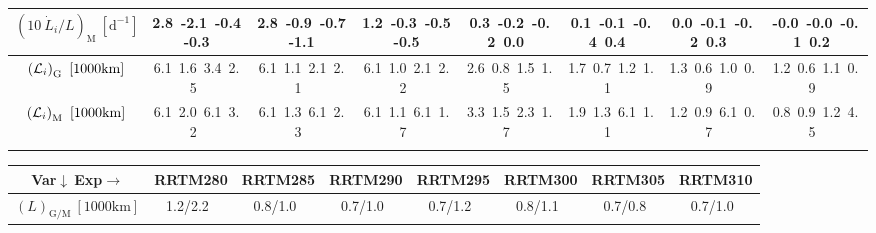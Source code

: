 \begin{table}[H]
{\begin{centering}
\begin{tabular}{|c|c|c|c|c|c|c|c|}
\hline
$\left(10\ \dot{L}_{i}/L\right)_{\mathrm{M}}\ \left[\mathrm{d^{-1}}\right]$ & \textcolor{C1}{2.8}\ \textcolor{C2}{-2.1}\ \textcolor{C3}{-0.4}\ \textcolor{C4}{-0.3}\  & \textcolor{C1}{2.8}\ \textcolor{C2}{-0.9}\ \textcolor{C3}{-0.7}\ \textcolor{C4}{-1.1}\  & \textcolor{C1}{1.2}\ \textcolor{C2}{-0.3}\ \textcolor{C3}{-0.5}\ \textcolor{C4}{-0.5}\  & \textcolor{C1}{0.3}\ \textcolor{C2}{-0.2}\ \textcolor{C3}{-0.2}\ \textcolor{C4}{0.0}\  & \textcolor{C1}{0.1}\ \textcolor{C2}{-0.1}\ \textcolor{C3}{-0.4}\ \textcolor{C4}{0.4}\  & \textcolor{C1}{0.0}\ \textcolor{C2}{-0.1}\ \textcolor{C3}{-0.2}\ \textcolor{C4}{0.3}\  & \textcolor{C1}{-0.0}\ \textcolor{C2}{-0.0}\ \textcolor{C3}{-0.1}\ \textcolor{C4}{0.2}\  \tabularnewline
\hline
$\left({\cal L}_{i}\right)_{\mathrm{G}}\ \left[1000\mathrm{km}\right]$ & \textcolor{C1}{6.1}\ \textcolor{C2}{1.6}\ \textcolor{C3}{3.4}\ \textcolor{C4}{2.5}\  & \textcolor{C1}{6.1}\ \textcolor{C2}{1.1}\ \textcolor{C3}{2.1}\ \textcolor{C4}{2.1}\  & \textcolor{C1}{6.1}\ \textcolor{C2}{1.0}\ \textcolor{C3}{2.1}\ \textcolor{C4}{2.2}\  & \textcolor{C1}{2.6}\ \textcolor{C2}{0.8}\ \textcolor{C3}{1.5}\ \textcolor{C4}{1.5}\  & \textcolor{C1}{1.7}\ \textcolor{C2}{0.7}\ \textcolor{C3}{1.2}\ \textcolor{C4}{1.1}\  & \textcolor{C1}{1.3}\ \textcolor{C2}{0.6}\ \textcolor{C3}{1.0}\ \textcolor{C4}{0.9}\  & \textcolor{C1}{1.2}\ \textcolor{C2}{0.6}\ \textcolor{C3}{1.1}\ \textcolor{C4}{0.9}\  \tabularnewline
\hline
$\left({\cal L}_{i}\right)_{\mathrm{M}}\ \left[1000\mathrm{km}\right]$ & \textcolor{C1}{6.1}\ \textcolor{C2}{2.0}\ \textcolor{C3}{6.1}\ \textcolor{C4}{3.2}\  & \textcolor{C1}{6.1}\ \textcolor{C2}{1.3}\ \textcolor{C3}{6.1}\ \textcolor{C4}{2.3}\  & \textcolor{C1}{6.1}\ \textcolor{C2}{1.1}\ \textcolor{C3}{6.1}\ \textcolor{C4}{1.7}\  & \textcolor{C1}{3.3}\ \textcolor{C2}{1.5}\ \textcolor{C3}{2.3}\ \textcolor{C4}{1.7}\  & \textcolor{C1}{1.9}\ \textcolor{C2}{1.3}\ \textcolor{C3}{6.1}\ \textcolor{C4}{1.1}\  & \textcolor{C1}{1.2}\ \textcolor{C2}{0.9}\ \textcolor{C3}{6.1}\ \textcolor{C4}{0.7}\  & \textcolor{C1}{0.8}\ \textcolor{C2}{0.9}\ \textcolor{C3}{1.2}\ \textcolor{C4}{4.5}\  \tabularnewline
\hline
 &  &  &  &  &  &  & \tabularnewline
\hline
\end{tabular}
\begin{tabular}{|c|c|c|c|c|c|c|c|}
\hline
Var$\downarrow\ $Exp$\rightarrow$ & RRTM280 & RRTM285 & RRTM290 & RRTM295 & RRTM300 & RRTM305 & RRTM310 \tabularnewline
\hline
\hline
$\left(L\right)_{\mathrm{G/M}}\ \left[1000\mathrm{km}\right]$ & 1.2/2.2\ & 0.8/1.0\ & 0.7/1.0\ & 0.7/1.2\ & 0.8/1.1\ & 0.7/0.8\ & 0.7/1.0\ \tabularnewline

\end{tabular}
\end{centering}}
\end{table}
